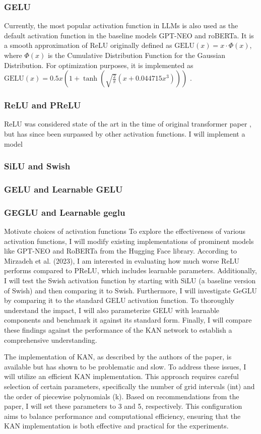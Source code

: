 \subsubsection{GELU}
Currently, the most popular activation function in LLMs is also used as the default activation function in the baseline models GPT-NEO and roBERTa. It is a smooth approximation of ReLU originally defined as \(\text{GELU}(x) = x \cdot \Phi(x)\), where \(\Phi(x)\) is the Cumulative Distribution Function for the Gaussian Distribution. For optimization purposes, it is implemented as \(\text{GELU}(x) = 0.5x \left(1 + \tanh\left(\sqrt{\frac{2}{\pi}} \left(x + 0.044715x^3\right)\right)\right)\) \cite{Hendrycks2023}.

\subsubsection{ReLU and PReLU}
ReLU was considered state of the art in the time of original transformer paper \cite{Vaswani2017}, but has since been surpassed by other activation functions. I will implement a model 

\subsubsection{SiLU and Swish}

\subsubsection{GELU and Learnable GELU}

\subsubsection{GEGLU and Learnable geglu}

Motivate choices of activation functions
To explore the effectiveness of various activation functions, I will modify existing implementations of prominent models like GPT-NEO and RoBERTa from the Hugging Face library. According to Mirzadeh et al. (2023), I am interested in evaluating how much worse ReLU performs compared to PReLU, which includes learnable parameters. Additionally, I will test the Swish activation function by starting with SiLU (a baseline version of Swish) and then comparing it to Swish. Furthermore, I will investigate GeGLU by comparing it to the standard GELU activation function. To thoroughly understand the impact, I will also parameterize GELU with learnable components and benchmark it against its standard form. Finally, I will compare these findings against the performance of the KAN network to establish a comprehensive understanding.

The implementation of KAN, as described by the authors of the paper, is available but has shown to be problematic and slow. To address these issues, I will utilize an efficient KAN implementation. This approach requires careful selection of certain parameters, specifically the number of grid intervals (int) and the order of piecewise polynomials (k). Based on recommendations from the paper, I will set these parameters to 3 and 5, respectively. This configuration aims to balance performance and computational efficiency, ensuring that the KAN implementation is both effective and practical for the experiments.